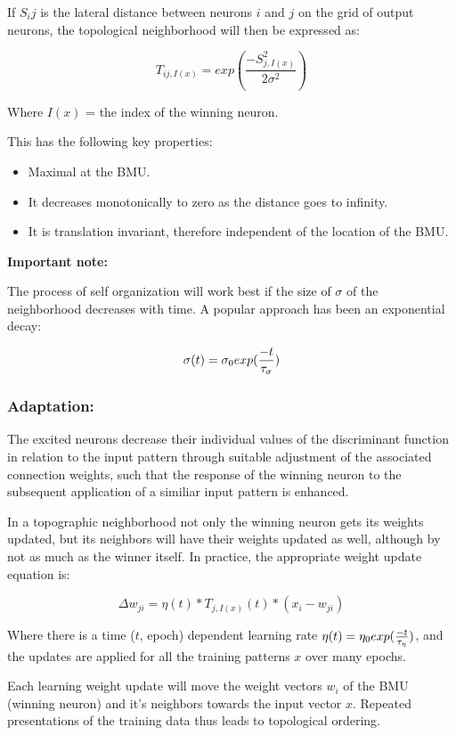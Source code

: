 \documentclass[]{book}
\providecommand{\tightlist}{%
  \setlength{\itemsep}{0pt}\setlength{\parskip}{0pt}}
\begin{document}
If \(S_ij\) is the lateral distance between neurons \(i\) and \(j\) on
the grid of output neurons, the topological neighborhood will then be
expressed as:

\[T_{ij,I(x)} = exp \left( \frac{-S^2_{j,I(x)}}{2\sigma^2}\right)\]

Where \(I(x)\) = the index of the winning neuron.

This has the following key properties:

\begin{itemize}
\tightlist
\item
  Maximal at the BMU.
\item
  It decreases monotonically to zero as the distance goes to infinity.
\item
  It is translation invariant, therefore independent of the location of
  the BMU.
\end{itemize}

\textbf{Important note:}

The process of self organization will work best if the size of
\(\sigma\) of the neighborhood decreases with time. A popular approach
has been an exponential decay:

\[\sigma(t) = \sigma_0\space exp(\frac{-t}{\tau_{\sigma}})\]

\subsubsection{Adaptation:}\label{adaptation}

The excited neurons decrease their individual values of the discriminant
function in relation to the input pattern through suitable adjustment of
the associated connection weights, such that the response of the winning
neuron to the subsequent application of a similiar input pattern is
enhanced.

In a topographic neighborhood not only the winning neuron gets its
weights updated, but its neighbors will have their weights updated as
well, although by not as much as the winner itself. In practice, the
appropriate weight update equation is:

\[\Delta w_{ji} = \eta(t) * T_{j,I(x)}(t) * (x_i - w_{ji})\]

Where there is a time (\(t\), epoch) dependent learning rate
\(\eta(t) = \eta_0 \space exp(\frac{-t}{\tau_\eta})\), and the updates
are applied for all the training patterns \(x\) over many epochs.

Each learning weight update will move the weight vectors
\textbf{\(w_i\)} of the BMU (winning neuron) and it's neighbors towards
the input vector \textbf{\(x\)}. Repeated presentations of the training
data thus leads to topological ordering.
\end{document}
